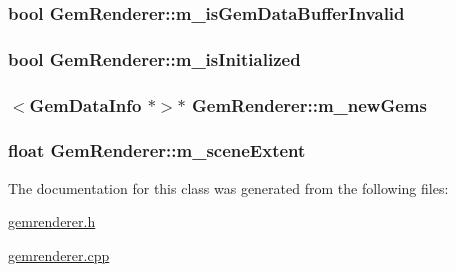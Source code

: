 \hypertarget{class_gem_renderer_aabd20f07edbe436be86c9b29d4e05fa8}{
\subsubsection[{m\+\_\+is\+Gem\+Data\+Buffer\+Invalid}]{\setlength{\rightskip}{0pt plus 5cm}bool Gem\+Renderer\+::m\+\_\+is\+Gem\+Data\+Buffer\+Invalid\hspace{0.3cm}{\ttfamily [protected]}}}\label{class_gem_renderer_aabd20f07edbe436be86c9b29d4e05fa8}
\hypertarget{class_gem_renderer_abedb030e36a36f2faa096727bfdd226d}{
\subsubsection[{m\+\_\+is\+Initialized}]{\setlength{\rightskip}{0pt plus 5cm}bool Gem\+Renderer\+::m\+\_\+is\+Initialized\hspace{0.3cm}{\ttfamily [protected]}}}\label{class_gem_renderer_abedb030e36a36f2faa096727bfdd226d}
\hypertarget{class_gem_renderer_ab93df8610036b343cdd98be3cd328aed}{
\subsubsection[{m\+\_\+new\+Gems}]{$<$Gem\+Data\+Info $\ast$$>$$\ast$ Gem\+Renderer\+::m\+\_\+new\+Gems\hspace{0.3cm}{\ttfamily [protected]}}}\label{class_gem_renderer_ab93df8610036b343cdd98be3cd328aed}
\hypertarget{class_gem_renderer_a24391e7dfe1663b9c74210fb0424487d}{
\subsubsection[{m\+\_\+scene\+Extent}]{\setlength{\rightskip}{0pt plus 5cm}float Gem\+Renderer\+::m\+\_\+scene\+Extent\hspace{0.3cm}{\ttfamily [protected]}}}\label{class_gem_renderer_a24391e7dfe1663b9c74210fb0424487d}


The documentation for this class was generated from the following files\+:\begin{DoxyCompactItemize}
\item 
\hyperlink{gemrenderer_8h}{gemrenderer.\+h}\item 
\hyperlink{gemrenderer_8cpp}{gemrenderer.\+cpp}\end{DoxyCompactItemize}
